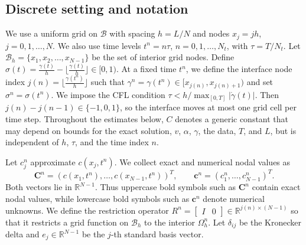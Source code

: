 \documentclass[11pt,reqno]{amsart}
\theoremstyle{plain}
\theoremstyle{definition}
\numberwithin{equation}{section}
\newcommand{\mc}[1]{\mathcal{#1}}
\newcommand{\bm}[1]{\boldsymbol{#1}}
\newcommand{\abs}[1]{\left\lvert #1 \right\rvert}
\newcommand{\R}{\mathbb{R}}
\begin{document}
\subsection{Discrete setting and notation}
We use a uniform grid on $\mc B$ with spacing $h=L/N$ and nodes $x_j=jh$,
$j=0,1,\dots,N$. We also use time levels $t^n=n\tau$, $n=0,1,\dots,N_t$,
with $\tau=T/N_t$. Let $\mc B_h=\{x_1,x_2,\dots,x_{N-1}\}$ be the set of
interior grid nodes.
Define $\sigma(t) = \frac{\gamma(t)}{h} - \lfloor\frac{\gamma(t)}{h}\rfloor\in [0,1)$.
At a fixed time $t^n$, we define the interface node index $j(n)=\lfloor\frac{\gamma(t^n)}{h}\rfloor$ such that $\gamma^n = \gamma(t^n)\in[x_{j(n)}, x_{j(n)+1})$ and set $\sigma^n = \sigma(t^n)$.
We impose the CFL condition
$\tau < h/\max_{[0,T]}\abs{\dot{\gamma}(t)}$. Then
$j(n)-j(n-1)\in\{-1,0,1\}$, so the interface moves at most one grid cell per
time step.
Throughout the estimates below, $C$ denotes a generic constant that may depend on bounds for the exact solution, $v$, $\alpha$, $\gamma$, the data, $T$, and $L$, but is independent of $h$, $\tau$, and the time index $n$.

Let $c_j^n$ approximate $c(x_j,t^n)$. We collect exact and numerical nodal
values as
\begin{equation}
\bm C^n=(c(x_1,t^n),\dots,c(x_{N-1},t^n))^T,\qquad
\bm c^n=(c_1^n,\dots,c_{N-1}^n)^T .
\end{equation}
Both vectors lie in $\R^{N-1}$.
Thus uppercase bold symbols such as $\bm C^n$ contain exact nodal values, while lowercase bold symbols such as $\bm c^n$ denote numerical unknowns.
We define the restriction operator
$
R^n =  \begin{bmatrix}
        I  & 0
    \end{bmatrix}\in \R^{j(n)\times (N-1)}
$
so that it restricts a grid function on $\mc B_h$ to the interior $\Omega_h^n$.
Let $\delta_{ij}$ be the Kronecker delta and $e_j\in\R^{N-1}$ be the $j$-th standard basis vector.
\end{document}
